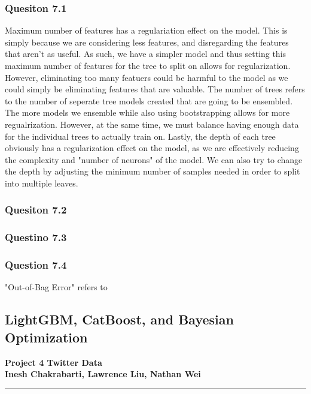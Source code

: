 \documentclass[11pt,letterpaper]{article}
\begin{document}
\subsubsection*{Quesiton 7.1}
Maximum number of features has a regulariation effect on the model. This is simply because we are considering less 
features, and disregarding the features that aren't as useful. As such, we have a simpler model and thus 
setting this maximum number of features for the tree to split on allows for regularization. However, eliminating
too many featuers could be harmful to the model as we could simply be eliminating features that are valuable.
The number of trees refers to the number of seperate tree models created that are going to be ensembled. The more models
we ensemble while
also using bootstrapping allows for more regualrization. However, at the same time, we must balance having enough data 
for the individual trees to actually train on. Lastly, the depth of each tree obviously has a regularization effect 
on the model, as we are effectively reducing the complexity and "number of neurons" of the model. We can also try 
to change the depth by adjusting the minimum number of samples needed in order to split into multiple leaves. 

\subsubsection*{Quesiton 7.2}
\subsubsection*{Questino 7.3}
\subsubsection*{Question 7.4}
"Out-of-Bag Error" refers to 

\subsection*{LightGBM, CatBoost, and Bayesian Optimization}
\pagebreak
\begin{center}
    \begin{minipage}{10cm}
    	\begin{center}
    	\textbf{\large Project 4 Twitter Data}\\[0.1cm]
        \textbf{Inesh Chakrabarti, Lawrence Liu, Nathan Wei}\\[0.1cm]
    	\end{center}
    \end{minipage}\hfill
\end{center}
\rule{17cm}{0.1mm}



\end{document}
